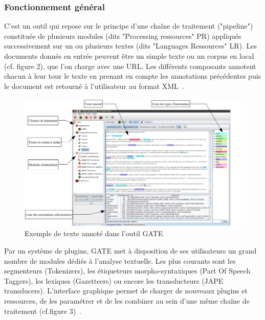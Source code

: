 \documentclass[a4paper, 11pt]{report}
\begin{document}
\subsubsection{Fonctionnement général}
C'est un outil qui repose sur le principe d'une chaîne de traitement ("pipeline") constituée de plusieurs modules (dits "Processing ressources" PR) appliqués successivement sur un ou plusieurs textes (dits "Languages Ressources" LR). Les documents donnés en entrée peuvent être un simple texte ou un corpus en local (cf. figure 2), que l'on charge avec une URL. Les différents composants annotent chacun à leur tour le texte en prenant en compte les annotations précédentes puis le document est retourné à l'utilisateur au format XML~\cite{SL10}.
\begin{figure}[H]
\begin{center}
\includegraphics[scale=0.3]{img/exempleAnnotationGATE.png} 
\end{center}
\caption{Exemple de texte annoté dans l'outil GATE}
\end{figure}
Par un système de plugins, GATE met à disposition de ses utilisateurs un grand nombre de
modules dédiés à l'analyse textuelle. Les plus courants sont les segmenteurs (Tokenizers), les
étiqueteurs morpho-syntaxiques (Part Of Speech Taggers), les lexiques (Gazetteers) ou encore les
transducteurs (JAPE transducers). L'interface graphique permet de charger de nouveaux plugins et
ressources, de les paramétrer et de les combiner au sein d'une même chaîne de traitement (cf.figure 3)~\cite{SL10}.
\end{document}
